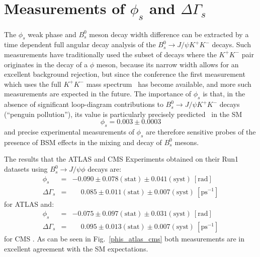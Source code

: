 \section{Measurements of $\phi_s$ and $\Delta\Gamma_s$}
\label{sec:phisdgs}

The $\phi_s$ weak phase and $B^0_s$ meson decay width difference can
be extracted by a time dependent full angular decay analysis of the 
$B^0_s \to J/\psi K^+ K^-$ decays. Such measurements have traditionally
used the subset of decays where the $K^+ K^-$ pair originates in the decay
of a $\phi$ meson, because its narrow width allows for an excellent background
rejection, but since the conference the first measurement which uses
the full $K^+ K^-$ mass spectrum~\cite{LHCbKKHighMass} has become available, and
more such measurements are expected in the future. The importance of
$\phi_s$ is that, in the absence of significant loop-diagram contributions
to $B^0_s \to J/\psi K^+ K^-$ decays (``penguin pollution''),
its value is particularly precisely predicted~\cite{PHISSM} in the SM
\begin{equation}  
\phi_s = 0.003 \pm 0.0003
\end{equation}
and precise experimental measurements of $\phi_s$ are therefore 
sensitive probes of the presence of BSM effects in the mixing and decay of $B^0_s$ mesons.

The results that the ATLAS and CMS Experiments obtained on their Run1
datasets using $B^0_s \to J/\psi \phi$ decays are:
\begin{eqnarray}
  \phi_s & = & -0.090 \pm 0.078 (\mbox{stat}) \pm 0.041 (\mbox{syst})\:[\mbox{rad}] \\
  \Delta\Gamma_s & = & \phantom{-}0.085 \pm 0.011 (\mbox{stat}) \pm 0.007 (\mbox{syst})\:[\mbox{ps}^{-1}]
\end{eqnarray}
for ATLAS \cite{atlas_phis_8TeV} and:
\begin{eqnarray}
  \phi_s & = & -0.075 \pm 0.097 (\mbox{stat}) \pm 0.031 (\mbox{syst})\:[\mbox{rad}] \\
  \Delta\Gamma_s & = & \phantom{-}0.095 \pm 0.013 (\mbox{stat}) \pm 0.007 (\mbox{syst})\:[\mbox{ps}^{-1}]
\end{eqnarray}
for CMS \cite{cms_phis}. As can be seen in Fig.~\ref{phis_atlas_cms} both measurements are in
excellent agreement with the SM expectations.

